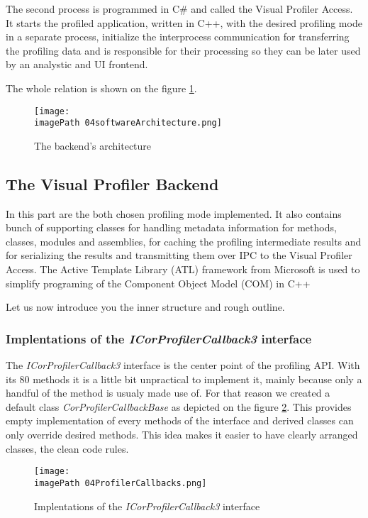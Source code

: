 The second process is programmed in C\# and called the Visual Profiler Access. It starts the profiled application, written in C++, with the desired profiling mode in a separate process, initialize the interprocess communication for transferring the profiling data and is responsible for their processing so they can be later used by an analystic and UI frontend.

The whole relation is shown on the figure \ref{fig:04softwareArchitecture}.

\begin{figure}
	\centering
		\texttt{[image: \\imagePath 04softwareArchitecture.png]}
		\caption{The backend's architecture}
	\label{fig:04softwareArchitecture}
\end{figure}


\subsection{The Visual Profiler Backend }
In this part are the both chosen profiling mode implemented. It also contains bunch of supporting classes for handling metadata information for methods, classes, modules and assemblies, for caching the profiling intermediate results and for serializing the results and transmitting them over IPC to the Visual Profiler Access. The Active Template Library (ATL) framework from Microsoft is used to simplify programing of the Component Object Model (COM) in C++

Let us now introduce you the inner structure and rough outline.

\subsubsection{Implentations of the \textit{ICorProfilerCallback3 } interface}
The \textit{ICorProfilerCallback3} interface is the center point of the profiling API. With its 80 methods it is a little bit unpractical to implement it, mainly because only a handful of the method is usualy made use of. For that reason we created a default class \textit{CorProfilerCallbackBase} as depicted on the figure \ref{fig:04ProfilerCallbacks}. This provides empty implementation of every methods of the interface and derived classes can only override desired methods. This idea makes it easier to have clearly arranged classes, the clean code rules.

\begin{figure}
	\centering
		\texttt{[image: \\imagePath 04ProfilerCallbacks.png]}
		\caption{Implentations of the \textit{ICorProfilerCallback3} interface}
	\label{fig:04ProfilerCallbacks}
\end{figure}

